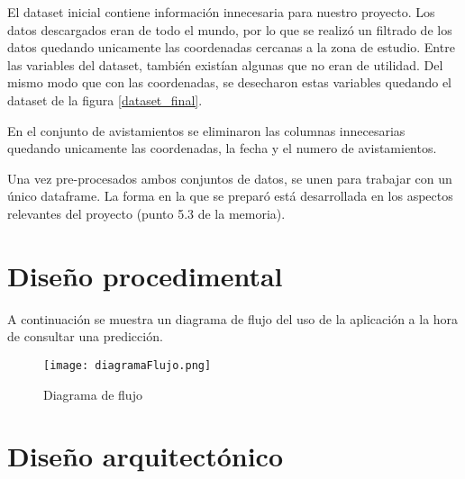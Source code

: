 El dataset inicial contiene información innecesaria para nuestro proyecto. Los datos descargados eran de todo el mundo, por lo que se realizó un filtrado de los datos quedando unicamente las coordenadas cercanas a la zona de estudio. Entre las variables del dataset, también existían algunas que no eran de utilidad. Del mismo modo que con las coordenadas, se desecharon estas variables quedando el dataset de la figura \ref{dataset_final}.

\label{dataset_final}

En el conjunto de avistamientos se eliminaron las columnas innecesarias quedando unicamente las coordenadas, la fecha y el numero de avistamientos.

Una vez pre-procesados ambos conjuntos de datos, se unen para trabajar con un único dataframe. La forma en la que se preparó está desarrollada en los aspectos relevantes del proyecto (punto 5.3 de la memoria).

\section{Diseño procedimental}

A continuación se muestra un diagrama de flujo del uso de la aplicación a la hora de consultar una predicción.

\begin{figure}[!h]
	\centering
	\texttt{[image: diagramaFlujo.png]}
	\caption{Diagrama de flujo}\label{fig:diagrama}
\end{figure}

\section{Diseño arquitectónico}


